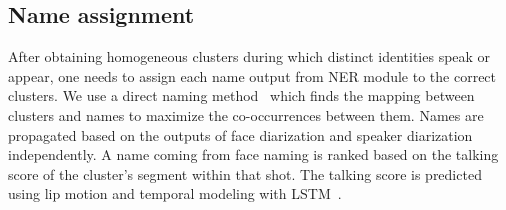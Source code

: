\subsection{Name assignment}

After obtaining homogeneous clusters during which distinct identities speak or appear, one needs to assign each name output from NER module to the correct clusters. 
%
%
We use a direct naming method~\cite{poignant2012fusion} which finds the mapping between clusters and names to maximize the co-occurrences between them.
%
Names are propagated based on the outputs of face diarization and speaker diarization independently. 
%
%
A name coming from face naming is ranked based on the talking score of the cluster's segment within that shot.
%
The talking score is predicted using lip motion and temporal modeling with LSTM~\cite{Le_ACMMM_2016}.

\endinput
